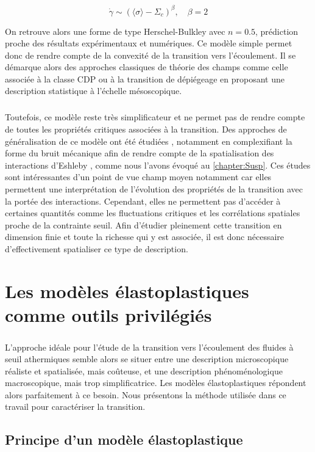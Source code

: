 \begin{equation}
	\dot{\gamma} \sim (\langle \sigma \rangle - \Sigma_c)^\beta, \quad \beta = 2
\end{equation}

\noindent On retrouve alors une forme de type Herschel-Bulkley avec $n=0.5$, prédiction proche des résultats expérimentaux et numériques. Ce modèle simple permet donc de rendre compte de la convexité de la transition vers l'écoulement. Il se démarque alors des approches classiques de théorie des champs comme celle associée à la classe CDP ou à la transition de dépiégeage en proposant une description statistique à l'échelle mésoscopique. 

\subparagraph{}Toutefois, ce modèle reste très simplificateur et ne permet pas de rendre compte de toutes les propriétés critiques associées à la transition. Des approches de généralisation de ce modèle ont été étudiées \cite{agoritsas_relevance_2015, bouchaud_spontaneous_2016}, notamment en complexifiant la forme du bruit mécanique afin de rendre compte de la spatialisation des interactions d'Eshleby \cite{lin_mean-field_2016, lin_microscopic_2018}, comme nous l'avons évoqué au \autoref{chapter:Susp}. Ces études sont intéressantes d'un point de vue champ moyen notamment car elles permettent une interprétation de l'évolution des propriétés de la transition avec la portée des interactions. Cependant, elles ne permettent pas d'accéder à certaines quantités comme les fluctuations critiques et les corrélations spatiales proche de la contrainte seuil. Afin d'étudier pleinement cette transition en dimension finie et toute la richesse qui y est associée, il est donc nécessaire d'effectivement spatialiser ce type de description. 

\section{Les modèles élastoplastiques comme outils privilégiés}

\subparagraph{}L'approche idéale pour l'étude de la transition vers l'écoulement des fluides à seuil athermiques semble alors se situer entre une description microscopique réaliste et spatialisée, mais coûteuse, et une description phénoménologique macroscopique, mais trop simplificatrice. Les modèles élastoplastiques répondent alors parfaitement à ce besoin. Nous présentons la méthode utilisée dans ce travail pour caractériser la transition.

\subsection{Principe d'un modèle élastoplastique}

